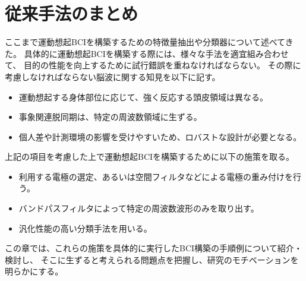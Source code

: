 \section{従来手法のまとめ}
ここまで運動想起BCIを構築するための特徴量抽出や分類器について述べてきた。
具体的に運動想起BCIを構築する際には、様々な手法を適宜組み合わせて、
目的の性能を向上するために試行錯誤を重ねなければならない。
その際に考慮しなければならない脳波に関する知見を以下に記す。
\begin{itemize}
    \item 運動想起する身体部位に応じて、強く反応する頭皮領域は異なる。
    \item 事象関連脱同期は、特定の周波数領域に生ずる。
    \item 個人差や計測環境の影響を受けやすいため、ロバストな設計が必要となる。
\end{itemize}
上記の項目を考慮した上で運動想起BCIを構築するために以下の施策を取る。
\begin{itemize}
    \item 利用する電極の選定、あるいは空間フィルタなどによる電極の重み付けを行う。
    \item バンドパスフィルタによって特定の周波数波形のみを取り出す。
    \item 汎化性能の高い分類手法を用いる。
\end{itemize}
この章では、これらの施策を具体的に実行したBCI構築の手順例について紹介・検討し、
そこに生ずると考えられる問題点を把握し、研究のモチベーションを明らかにする。

